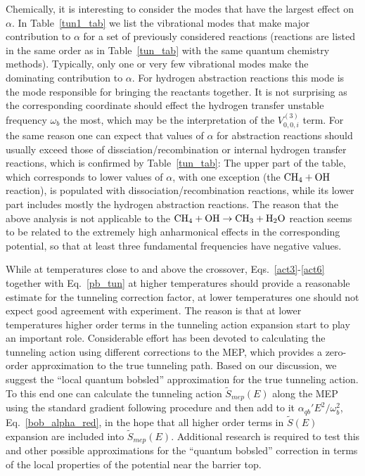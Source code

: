 \documentclass[journal=jpcafh,manuscript=article]{achemso}
\begin{document}
Chemically, it is interesting to consider the modes that have the
largest effect on $\alpha$.  In Table~\ref{tun1_tab} we list the
vibrational modes that make major contribution to $\alpha$ for a set
of previously considered reactions (reactions are listed in the same
order as in Table~\ref{tun_tab} with the same quantum chemistry
methods). Typically, only one or very few vibrational modes make the
dominating contribution to $\alpha$. For hydrogen abstraction
reactions this mode is the mode responsible for bringing the
reactants together. It is not surprising as the corresponding
coordinate should effect the hydrogen transfer unstable frequency
$\omega_b$ the most, which may be the interpretation of the
$V^{(3)}_{0,0,i}$ term. For the same reason one can expect that values
of $\alpha$ for abstraction reactions should usually exceed those of
dissciation/recombination or internal hydrogen transfer reactions,
which is confirmed by Table~\ref{tun_tab}: The upper part of the
table, which corresponds to lower values of $\alpha$, with one
exception (the $\rm CH_4+OH$ reaction), is populated with
dissociation/recombination reactions, while its lower part includes
mostly the hydrogen abstraction reactions. The reason that the above
analysis is not applicable to the $\rm CH_4+OH\rightarrow CH_3+ H_2O$
reaction seems to be related to the extremely high anharmonical
effects in the corresponding potential, so that at least three
fundamental frequencies have negative values.

While at temperatures close to and above the crossover,
Eqs.~\ref{act3}-\ref{act6} together with Eq.~\ref{pb_tun} at higher
temperatures should provide a reasonable estimate for the tunneling
correction factor, at lower temperatures one should not expect good
agreement with experiment. The reason is that at lower temperatures
higher order terms in the tunneling action expansion start to play an
important role. Considerable effort has been devoted to calculating
the tunneling action using different corrections to the
MEP,\cite{marcus77,scodje81,scodje82,liu93,liu93a,ramos05,paneda10}
which provides a zero-order approximation to the true tunneling
path.\cite{truhlar71,marcus77} Based on our discussion, we suggest the
``local quantum bobsled'' approximation for the true tunneling
action. To this end one can calculate the tunneling action
$\tilde{S}_{mep}(E)$ along the MEP using the standard gradient
following procedure and then add to it $\alpha_{qb}'E^2/\omega_b^2$,
Eq.~\ref{bob_alpha_red}, in the hope that all higher order terms in
$\tilde{S}(E)$ expansion are included into
$\tilde{S}_{mep}(E)$. Additional research is required to test this and
other possible approximations for the ``quantum bobsled'' correction
in terms of the local properties of the potential near the barrier
top.
\end{document}
